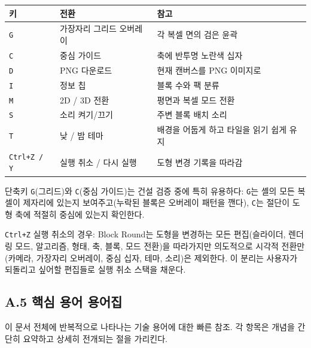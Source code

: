 \documentclass[12pt,a4paper]{scrartcl}
\newcommand{\code}[1]{\texttt{\small #1}}
\begin{document}
\vspace{0.4em}
\begin{center}
\begin{tabular}{@{}lll@{}}
\toprule
\textbf{키} & \textbf{전환} & \textbf{참고} \\
\midrule
\code{G} & 가장자리 그리드 오버레이  & 각 복셀 면의 검은 윤곽 \\
\code{C} & 중심 가이드  & 축에 반투명 노란색 십자 \\
\code{D} & PNG 다운로드  & 현재 캔버스를 PNG 이미지로 \\
\code{I} & 정보 칩  & 블록 수와 팩 분류 \\
\code{M} & 2D / 3D 전환  & 평면과 복셀 모드 전환 \\
\code{S} & 소리 켜기/끄기  & 주변 블록 배치 소리 \\
\code{T} & 낮 / 밤 테마  & 배경을 어둡게 하고 타일을 읽기 쉽게 유지 \\
\code{Ctrl+Z / Y} & 실행 취소 / 다시 실행  & 도형 변경 기록을 따라감 \\
\bottomrule
\end{tabular}
\end{center}

단축키 \code{G}(그리드)와 \code{C}(중심 가이드)는 건설 검증 중에 특히 유용하다: \code{G}는 셸의 모든 복셀이 제자리에 있는지 보여주고(누락된 블록은 오버레이 패턴을 깬다), \code{C}는 절단이 도형 축에 적절히 중심에 있는지 확인한다.

\code{Ctrl+Z} 실행 취소의 경우: Block Round는 도형을 변경하는 모든 편집(슬라이더, 렌더링 모드, 알고리즘, 형태, 축, 블록, 모드 전환)을 따라가지만 의도적으로 시각적 전환만(카메라, 가장자리 오버레이, 중심 십자, 테마, 소리)은 제외한다. 이 분리는 사용자가 되돌리고 싶어할 편집들로 실행 취소 스택을 채운다.

\subsection*{A.5 핵심 용어 용어집}

이 문서 전체에 반복적으로 나타나는 기술 용어에 대한 빠른 참조. 각 항목은 개념을 간단히 요약하고 상세히 전개되는 절을 가리킨다.
\end{document}

